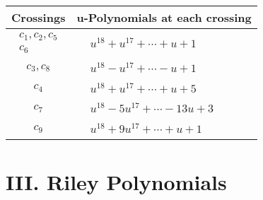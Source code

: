 \documentclass[1p]{elsarticle_modified}
\theoremstyle{definition}
\begin{document}
\begin{tabular}{m{50pt}|m{274pt}}
Crossings & \hspace{64pt}u-Polynomials at each crossing \\
\hline $$\begin{aligned}c_{1},c_{2},c_{5}\\c_{6}\end{aligned}$$&$\begin{aligned}
&u^{18}+u^{17}+\cdots+u+1
\end{aligned}$\\
\hline $$\begin{aligned}c_{3},c_{8}\end{aligned}$$&$\begin{aligned}
&u^{18}- u^{17}+\cdots- u+1
\end{aligned}$\\
\hline $$\begin{aligned}c_{4}\end{aligned}$$&$\begin{aligned}
&u^{18}+u^{17}+\cdots+u+5
\end{aligned}$\\
\hline $$\begin{aligned}c_{7}\end{aligned}$$&$\begin{aligned}
&u^{18}-5 u^{17}+\cdots-13 u+3
\end{aligned}$\\
\hline $$\begin{aligned}c_{9}\end{aligned}$$&$\begin{aligned}
&u^{18}+9 u^{17}+\cdots+u+1
\end{aligned}$\\
\hline
\end{tabular}\newpage\renewcommand{\arraystretch}{1}
\centering \section*{ III. Riley Polynomials}
\end{document}

